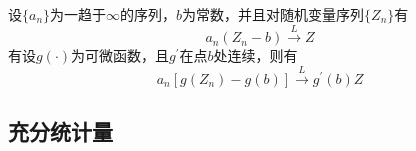 \begin{theorem}
    设$\{a_n\}$为一趋于$\infty$的序列，$b$为常数，并且对随机变量序列$\{Z_n\}$有
    \[
        a_n\left( Z_n-b \right)\overset{L}{\rightarrow}Z
    \]
    有设$g(\cdot)$为可微函数，且$g^{\prime}$在点$b$处连续，则有
    \[
       a_n\left[ g(Z_n)-g(b) \right]\overset{L}{\to} g^{\prime}(b)Z
    \]
\end{theorem}
\begin{example}
    
\end{example}
\subsection{充分统计量}



